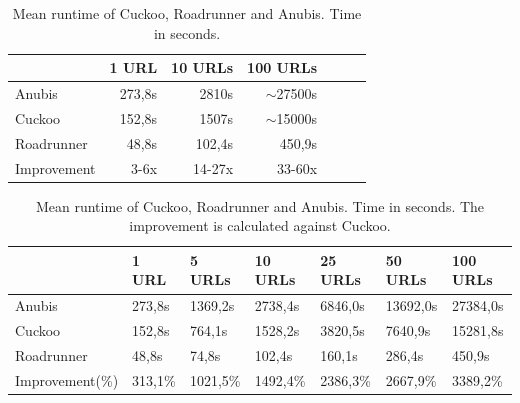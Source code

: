 \begin{table}[h]
\begin{tabular}{@{}lllllll@{}}
\toprule
                                  & 1 URL   & 10 URLs  & 100 URLs \\ \midrule
Anubis                            & \multicolumn{1}{r}{273,8s}  & \multicolumn{1}{r}{2810s}  & \multicolumn{1}{r}{\hbox{$\scriptstyle\sim$}27500s} \\                                  
Cuckoo                            & \multicolumn{1}{r}{152,8s}  & \multicolumn{1}{r}{1507s}  & \multicolumn{1}{r}{\hbox{$\scriptstyle\sim$}15000s} \\
Roadrunner                        & \multicolumn{1}{r}{48,8s}   & \multicolumn{1}{r}{102,4s}   & \multicolumn{1}{r}{450,9s}   \\
Improvement                       & \multicolumn{1}{r}{3-6x}    & \multicolumn{1}{r}{14-27x}   & \multicolumn{1}{r}{33-60x} \\ \bottomrule
\end{tabular}
\caption{Mean runtime of Cuckoo, Roadrunner and Anubis. Time in seconds.}
\label{tbl:results}
\end{table}
\begin{table}[h]
\begin{tabular}{@{}lllllll@{}}
\toprule
                                  & 1 URL    & 5 URLs   & 10 URLs      & 25 URLs      & 50 URLs     & 100 URLs \\ \midrule
Anubis       & 273,8s   & 1369,2s   & 2738,4s      & 6846,0s      & 13692,0s     & 27384,0s \\                                  
Cuckoo       & 152,8s   & 764,1s   & 1528,2s      & 3820,5s      & 7640,9s     & 15281,8s \\
Roadrunner& 48,8s    & 74,8s    & 102,4s       & 160,1s       & 286,4s      & 450,9s   \\
Improvement(\%)                   & 313,1\%  & 1021,5\% & 1492,4\%     & 2386,3\%     & 2667,9\%    & 3389,2\% \\ \bottomrule
\end{tabular}
\caption{Mean runtime of Cuckoo, Roadrunner and Anubis. Time in seconds. The improvement is calculated against Cuckoo.}
\label{tbl:results}
\end{table}

